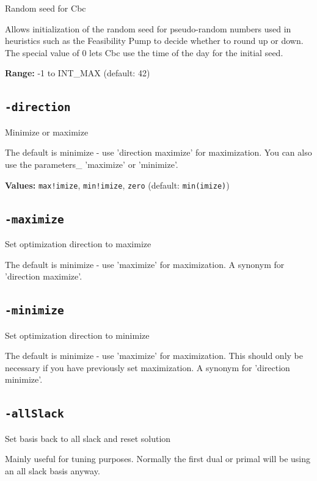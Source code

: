 \documentclass[11pt,a4paper]{article}
\begin{document}
Random seed for Cbc

Allows initialization of the random seed for pseudo-random numbers used in heuristics such as the Feasibility Pump to decide whether to round up or down. The special value of 0 lets Cbc use the time of the day for the initial seed.

\textbf{Range:} -1 to INT\_MAX (default: 42)

\subsection*{\texttt{-direction}}

Minimize or maximize

The default is minimize - use 'direction maximize' for maximization.
You can also use the parameters\_ 'maximize' or 'minimize'.

\textbf{Values:} \texttt{max!imize}, \texttt{min!imize}, \texttt{zero} (default: \texttt{min(imize)})

\subsection*{\texttt{-maximize}}

Set optimization direction to maximize

The default is minimize - use 'maximize' for maximization.
 A synonym for 'direction maximize'.

\subsection*{\texttt{-minimize}}

Set optimization direction to minimize

The default is minimize - use 'maximize' for maximization.
This should only be necessary if you have previously set maximization. A synonym for 'direction minimize'.

\subsection*{\texttt{-allSlack}}

Set basis back to all slack and reset solution

Mainly useful for tuning purposes.  Normally the first dual or primal will be using an all slack basis anyway.
\end{document}
